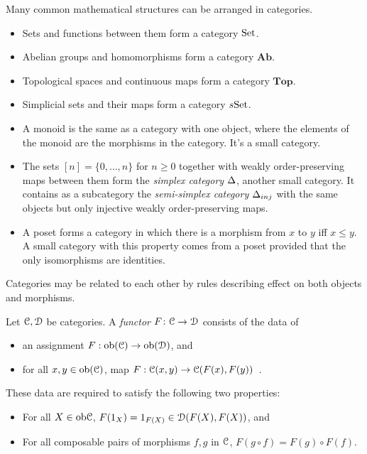 \begin{example}
Many common mathematical structures can be arranged in categories.
\begin{itemize}
\item Sets and functions between them form a category ${\mathrm{Set}}$.
\item Abelian groups and homomorphisms form a category $\mathbf{Ab}$.
\item Topological spaces and continuous maps form a category $\mathbf{Top}$.
\item Simplicial sets and their maps form a category $s{\mathrm{Set}}$.
\item A monoid is the same as a category with one object, where the elements of the monoid are the morphisms in the category. It's a small category.
\item The sets $[n]=\{0,\ldots,n\}$ for $n\geq 0$ together with weakly order-preserving maps between them form the {\em simplex category} ${\Delta}$, 
another small category. It contains as a subcategory the {\em semi-simplex
category} ${\Delta}_{inj}$ with the same objects but only injective weakly order-preserving maps. 
\item A poset forms a category in which there is a morphism from $x$ to $y$ iff $x\leq y$. A small category with this property comes from a poset provided 
that the only isomorphisms are identities. 
\end{itemize}
\end{example}

Categories may be related to each other by rules describing effect on both
objects and morphisms. 
\begin{definition}
Let $\mathcal C,\mathcal D$ be categories. A \emph{functor} $F\colon\mathcal C\to\mathcal D$ consists
of the data of 
\begin{itemize}
\item an assignment  $F:\mathrm{ob}(\mathcal C)\to\mathrm{ob}(\mathcal D)$, and
\item for all $x,y\in\mathrm{ob}(\mathcal C)$, map $F:\mathcal C(x,y)\to\mathcal C(F(x),F(y))$ \,.
\end{itemize}
These data are required to satisfy the following two properties:
\begin{itemize}
\item For all $X\in\mathrm{ob}\mathcal C$, $F(1_X)=1_{F(X)}\in\mathcal D(F(X),F(X))$, and
\item For all composable pairs of morphisms $f,g$ in $\mathcal C$, 
$F(g\circ f)=F(g)\circ F(f)$.
\end{itemize}
\end{definition}

